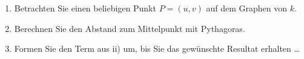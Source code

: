 \begin{ueb}
\begin{enumerate}
\begin{enumerate}
                        \begin{enumerate}
                            \item Betrachten Sie einen beliebigen Punkt
                                  \(P=(u, v)\) auf dem Graphen von \(k\).

                            \item Berechnen Sie den Abstand zum Mittelpunkt
                                  mit Pythagoras.

                            \item Formen Sie den Term aus ii) um, bis Sie
                                  das gewünschte Resultat erhalten \dots
                        \end{enumerate}
              \end{enumerate}
    \end{enumerate}
\end{ueb}

